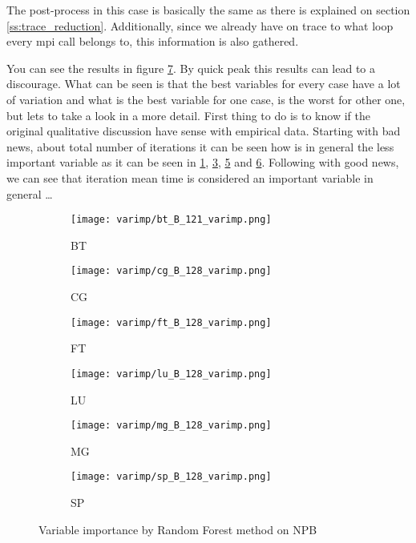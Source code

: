 The post-process in this case is basically the same as there is explained on
section \ref{ss:trace_reduction}. Additionally, since we already have on trace
to what loop every mpi call belongs to, this information is also gathered.

You can see the results in figure \ref{fig:varmap_results}. By quick peak this
results can lead to a discourage. What can be seen is that the best variables
for every case have a lot of variation and what is the best variable for one
case, is the worst for other one, but lets to take a look in a more detail.
First thing to do is to know if the original qualitative discussion have sense
with empirical data. Starting with bad news, about total number of iterations 
it can be seen how is in general the less important variable as it can be seen 
in \ref{fig:bt_varimp}, \ref{fig:ft_varimp}, \ref{fig:mg_varimp} and
\ref{fig:sp_varimp}. Following with good news, we can see that iteration mean
time is considered an important variable in general \ldots

\begin{figure}
    \centering
    \begin{subfigure}[b]{0.4\textwidth}
        \texttt{[image: varimp/bt\_B\_121\_varimp.png]}
        \caption{BT}
        \label{fig:bt_varimp}
    \end{subfigure}
    \quad
    \begin{subfigure}[b]{0.4\textwidth}
        \texttt{[image: varimp/cg\_B\_128\_varimp.png]}
        \caption{CG}
        \label{fig:cg_varimp}
    \end{subfigure}
   
    \begin{subfigure}[b]{0.4\textwidth}
        \texttt{[image: varimp/ft\_B\_128\_varimp.png]}
        \caption{FT}
        \label{fig:ft_varimp}
    \end{subfigure}
    \quad
    \begin{subfigure}[b]{0.4\textwidth}
        \texttt{[image: varimp/lu\_B\_128\_varimp.png]}
        \caption{LU}
        \label{fig:lu_varimp}
    \end{subfigure}
  
    \begin{subfigure}[b]{0.4\textwidth}
        \texttt{[image: varimp/mg\_B\_128\_varimp.png]}
        \caption{MG}
        \label{fig:mg_varimp}
    \end{subfigure}
    \quad
    \begin{subfigure}[b]{0.4\textwidth}
        \texttt{[image: varimp/sp\_B\_128\_varimp.png]}
        \caption{SP}
        \label{fig:sp_varimp}
    \end{subfigure}
    \caption{Variable importance by Random Forest method on NPB}
    \label{fig:varmap_results}
\end{figure}

